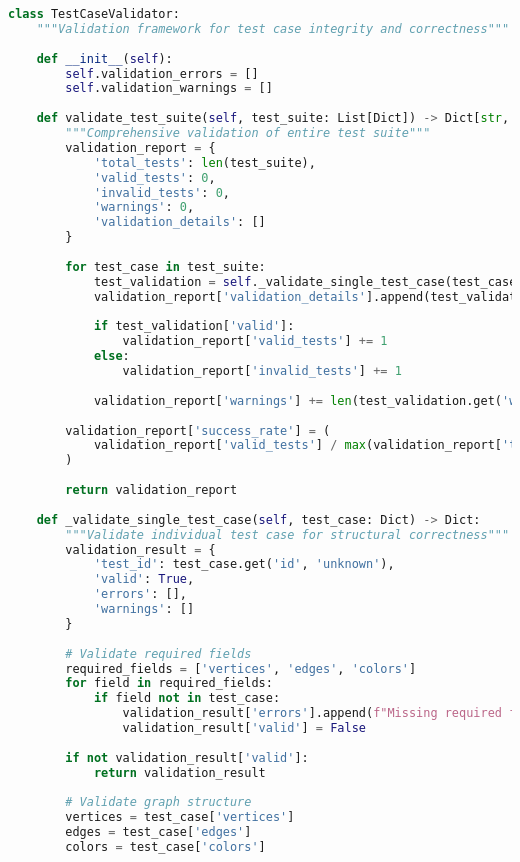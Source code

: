 \begin{lstlisting}[language=Python, caption=Test Case Validation and Verification]
class TestCaseValidator:
    """Validation framework for test case integrity and correctness"""
    
    def __init__(self):
        self.validation_errors = []
        self.validation_warnings = []
    
    def validate_test_suite(self, test_suite: List[Dict]) -> Dict[str, Any]:
        """Comprehensive validation of entire test suite"""
        validation_report = {
            'total_tests': len(test_suite),
            'valid_tests': 0,
            'invalid_tests': 0,
            'warnings': 0,
            'validation_details': []
        }
        
        for test_case in test_suite:
            test_validation = self._validate_single_test_case(test_case)
            validation_report['validation_details'].append(test_validation)
            
            if test_validation['valid']:
                validation_report['valid_tests'] += 1
            else:
                validation_report['invalid_tests'] += 1
            
            validation_report['warnings'] += len(test_validation.get('warnings', []))
        
        validation_report['success_rate'] = (
            validation_report['valid_tests'] / max(validation_report['total_tests'], 1)
        )
        
        return validation_report
    
    def _validate_single_test_case(self, test_case: Dict) -> Dict:
        """Validate individual test case for structural correctness"""
        validation_result = {
            'test_id': test_case.get('id', 'unknown'),
            'valid': True,
            'errors': [],
            'warnings': []
        }
        
        # Validate required fields
        required_fields = ['vertices', 'edges', 'colors']
        for field in required_fields:
            if field not in test_case:
                validation_result['errors'].append(f"Missing required field: {field}")
                validation_result['valid'] = False
        
        if not validation_result['valid']:
            return validation_result
        
        # Validate graph structure
        vertices = test_case['vertices']
        edges = test_case['edges']
        colors = test_case['colors']
        

\end{lstlisting}
